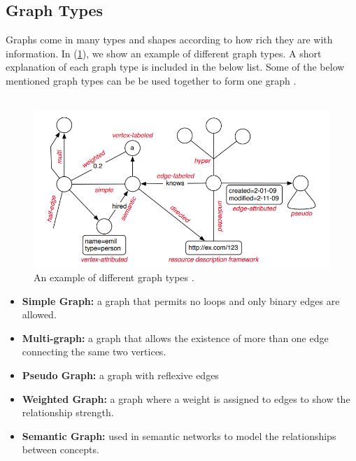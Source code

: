 {\subsection{Graph Types}
\label{subsec:GraphTypes}

Graphs come in many types and shapes according to how rich they are with information. In (\ref{fig:graph-types}), we show an example of different graph types. A short explanation of each graph type is included in the below list. Some of the below mentioned graph types can be be used together to form one graph \cite{DBLP:journals/corr/abs-1006-2361}.
\\
\\

\begin{figure}
\centering
\includegraphics[width=17cm]{pics/graph-types.png}
\caption{An example of different graph types \cite{DBLP:journals/corr/abs-1006-2361}.}
\label{fig:graph-types}
\end{figure} 

\begin{itemize}  
\item \textbf{Simple Graph:} a graph that permits no loops and only binary edges are allowed.

\item \textbf{Multi-graph:} a graph that allows the existence of more than one edge connecting the same two vertices.

\item \textbf{Pseudo Graph:} a graph with reflexive edges

\item \textbf{Weighted Graph:} a graph where a weight is assigned to edges to show the relationship strength.

\item \textbf{Semantic Graph:} used in semantic networks to model the relationships between concepts.


\end{itemize}}
